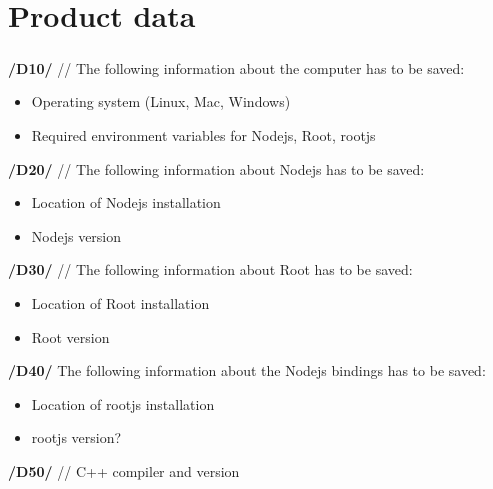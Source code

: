 \chapter{Product data}

\paragraph{}
\textbf{/D10/} //
The following information about the computer has to be saved: 
\begin{itemize}
	\item Operating system (Linux, Mac, Windows) 
	\item Required environment variables for Nodejs, Root, rootjs 
\end{itemize}


\textbf{/D20/} //
The following information about Nodejs has to be saved: 
\begin{itemize}
	\item Location of Nodejs installation 
 	\item Nodejs version 
\end{itemize}

\textbf{/D30/} //
The following information about Root has to be saved:
\begin{itemize}
	\item Location of Root installation
	\item Root version
\end{itemize}

\textbf{/D40/}
The following information about the Nodejs bindings has to be saved:
\begin{itemize}
	\item Location of rootjs installation
	\item rootjs version?
\end{itemize}

\textbf{/D50/} //
C++ compiler and version
